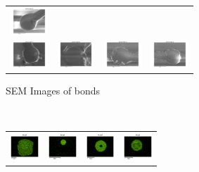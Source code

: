 \begin{figure}[h]
\begin{subfigure}[t]{0.4\textwidth}
\begin{tabular}{c c c c}
    \includegraphics[height=1cm]{Main/Ch2/extracted/SEM/In-EP-EDx_TLED-02-A1-s2_media_image.png} \\
    \includegraphics[height=1cm]{Main/Ch2/extracted/SEM/In-EP-EDx_TLED-02-A2-s1_media_image.png} &
    \includegraphics[height=1cm]{Main/Ch2/extracted/SEM/In-EP-EDx_TLED-02-A2-s2_media_image.png} &
    \includegraphics[height=1cm]{Main/Ch2/extracted/SEM/In-EP-EDx_TLED-02-B2-s1_media_image.png} &
    \includegraphics[height=1cm]{Main/Ch2/extracted/SEM/In-EP-EDx_TLED-02-B2-s2_media_image.png} \\
    \end{tabular}
    \caption{SEM Images of bonds}
    \label{fig:SEM_indium_2}
\end{subfigure}
~
\begin{subfigure}[t]{0.4\textwidth}
    \centering
    \begin{tabular}{c c c c}
    \includegraphics[height=1cm]{Main/Ch2/extracted/Indium/In-EP-EDx_TBP-01-A1-s1_media_image7.png} &
    \includegraphics[height=1cm]{Main/Ch2/extracted/Indium/In-EP-EDx_TBP-01-A1-s2_media_image7.png} &
    \includegraphics[height=1cm]{Main/Ch2/extracted/Indium/In-EP-EDx_TBP-01-A2-s1_media_image7.png} &
    \includegraphics[height=1cm]{Main/Ch2/extracted/Indium/In-EP-EDx_TBP-01-A2-s2_media_image7.png} \\

\end{tabular}
\end{subfigure}
\end{figure}
